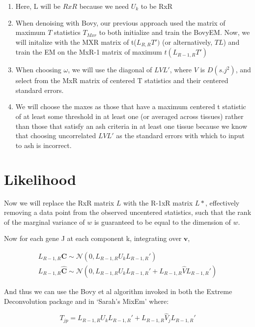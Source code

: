 \documentclass[11pt, oneside]{article}   	%
\newcommand{\Norm}{{\mathcal{N}}} %
\newcommand{\ceff}{\bm{C}}
\newcommand{\chat}{\bm{\hat{C}}}
\newcommand{\vb}{\bm{v}}
\begin{document}
\begin{itemize}
\begin{enumerate}
\item Here, L will be $RxR$ because we need $U_{k}$ to be RxR
\item When denoising with Bovy, our previous approach used the matrix of maximum $T$ statistics $T_{Mxr}$ to both initialize and train the BovyEM. Now, we will initalize with the MXR matrix of t($L_{R,R}T')$ (or alternatively, $TL$) and train the EM on the MxR-1 matrix of maximum $t(L_{R-1,R}T')$
\item When choosing $\omega$, we will use the diagonal of $L V L'$, where $V$ is $D(s.j^2)$, and select from the MxR matrix of centered T statistics and their centered standard errors.
\item We will choose the maxes as those that have a maximum centered t statistic of at least some threshold in at least one (or averaged across tissues) rather than those that satisfy an ash criteria in at least one tissue because we know that choosing uncorrelated $L V L'$ as the standard errors with which to input to ash  is incorrect.
\end{enumerate}


\section{Likelihood}

Now we will replace the RxR matrix $L$ with the R-1xR matrix $L*$, effectively removing a data point from the observed uncentered statistics, such that the rank of the marginal variance of $w$ is guaranteed to be equal to the dimension of $w$.

Now for each gene J at each component k, integrating over $\vb$, 


\begin{equation}
\begin{aligned}
\label{maxlike}
L_{R-1,R} \ceff \sim \Norm (0, L_{R-1,R} U_{k} L_{R-1,R} ') \\
L_{R-1,R} \chat \sim \Norm (0, L_{R-1,R}  U_{k} L_{R-1,R} ' + L_{R-1,R} \hat{V} L_{R-1,R} ') 
\end{aligned}
\end{equation}


And thus we can use the Bovy et al algorithm invoked in both the Extreme Deconvolution package and in `Sarah's MixEm' where:

\begin{equation}
 T_{jp} = L_{R-1,R} U_k L_{R-1,R}' + L_{R-1,R} \hat{V}_{j} L_{R-1,R}'
\end{equation}


\end{itemize}
\end{document}
